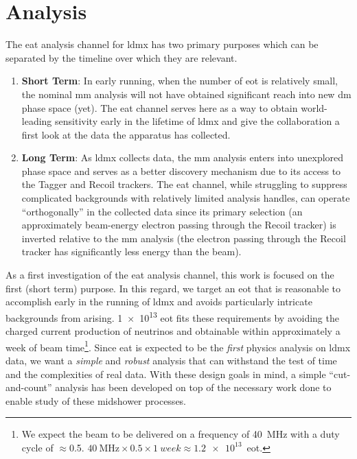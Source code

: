 \chapter{Analysis}
\label{chapter:ldmx:analysis}

The \ac{eat} analysis channel for \ac{ldmx} has two primary purposes which can
be separated by the timeline over which they are relevant.
\begin{enumerate}
    \item \textbf{Short Term}: In early running, when the number of \ac{eot} is
    relatively small, the nominal \ac{mm} analysis will not have obtained
    significant reach into new \ac{dm} phase space (yet). The \ac{eat} channel
    serves here as a way to obtain world-leading sensitivity early in the lifetime
    of \ac{ldmx} and give the collaboration a first look at the data the apparatus
    has collected.
    \item \textbf{Long Term}: As \ac{ldmx} collects data, the \ac{mm}
    analysis enters into unexplored phase space and serves as a better discovery
    mechanism due to its access to the Tagger and Recoil trackers. The \ac{eat}
    channel, while struggling to suppress complicated backgrounds with relatively
    limited analysis handles, can operate ``orthogonally'' in the collected data
    since its primary selection (an approximately beam-energy electron passing
    through the Recoil tracker) is inverted relative to the \ac{mm} analysis
    (the electron passing through the Recoil tracker has significantly less
    energy than the beam).
\end{enumerate}
As a first investigation of the \ac{eat} analysis channel, this work is focused on
the first (short term) purpose. In this regard, we target an \ac{eot} that is reasonable
to accomplish early in the running of \ac{ldmx} and avoids particularly intricate backgrounds
from arising. \num{1e13} \ac{eot} fits these requirements by avoiding the charged current production
of neutrinos and obtainable within approximately a week of beam time\footnote{
    We expect the beam to be delivered on a frequency of \qty{40}{\mega\hertz} with a
    duty cycle of $\approx$\num{0.5}. 
    $\qty{40}{\mega\hertz}\times0.5\times\qty{1}{week}\approx\num{1.2e13}$~\ac{eot}.
}. 
Since \ac{eat} is expected to be the \emph{first} physics
analysis on \ac{ldmx} data, we want a \emph{simple} and \emph{robust} analysis that can withstand
the test of time and the complexities of real data.
With these design goals in mind, a simple ``cut-and-count'' analysis has been developed
on top of the necessary work done to enable study of these midshower processes.

